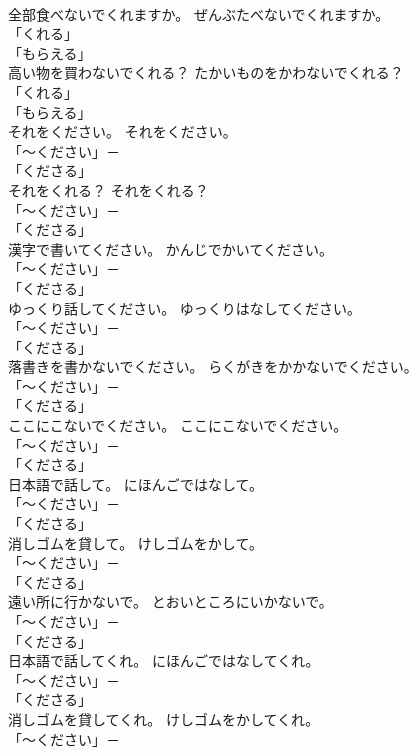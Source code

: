 \documentclass[8pt]{extreport}
\begin{document}
\begin{CJK}{UTF8}{min}
\\	全部食べないでくれますか。	ぜんぶたべないでくれますか。	
\\	「くれる」 
\\	「もらえる」
\\	高い物を買わないでくれる？	たかいものをかわないでくれる？	
\\	「くれる」 
\\	「もらえる」
\\	それをください。	それをください。	
\\	「～ください」－ 
\\	「くださる」	
\\	それをくれる？	それをくれる？	
\\	「～ください」－ 
\\	「くださる」	
\\	漢字で書いてください。	かんじでかいてください。	
\\	「～ください」－ 
\\	「くださる」	
\\	ゆっくり話してください。	ゆっくりはなしてください。	
\\	「～ください」－ 
\\	「くださる」	
\\	落書きを書かないでください。	らくがきをかかないでください。	
\\	「～ください」－ 
\\	「くださる」	
\\	ここにこないでください。	ここにこないでください。	
\\	「～ください」－ 
\\	「くださる」	
\\	日本語で話して。	にほんごではなして。	
\\	「～ください」－ 
\\	「くださる」	
\\	消しゴムを貸して。	けしゴムをかして。	
\\	「～ください」－ 
\\	「くださる」	
\\	遠い所に行かないで。	とおいところにいかないで。	
\\	「～ください」－ 
\\	「くださる」	
\\	日本語で話してくれ。	にほんごではなしてくれ。	
\\	「～ください」－ 
\\	「くださる」	
\\	消しゴムを貸してくれ。	けしゴムをかしてくれ。	
\\	「～ください」－ 

\end{CJK}
\end{document}
